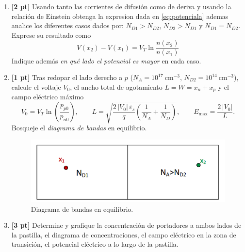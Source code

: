 \begin{enumerate}
  \item \textbf{[2 pt]}\;
  Usando tanto las corrientes de difusión como de deriva y usando la relación de Einstein obtenga la expresion dada en \eqref{eq:potenciala} ademas analice los diferentes casos dados por:
  \(N_{D1}>N_{D2}\), \(N_{D2}>N_{D1}\) y \(N_{D1}=N_{D2}\).
  Exprese su resultado como
  \begin{equation}
    V(x_2)-V(x_1)=V_T\ln\!\frac{n(x_2)}{n(x_1)}
    \label{eq:potenciala}
  \end{equation}
  Indique además \emph{en qué lado el potencial es mayor} en cada caso.

  \item \textbf{[1 pt]}\;
  Tras redopar el lado derecho a \(p\) (\(N_A=10^{17}~\mathrm{cm^{-3}}\), \(N_{D2}=10^{14}~\mathrm{cm^{-3}}\)),
  calcule el voltaje  \(V_0\), el ancho total de agotamiento \(L=W=x_n+x_p\) y el campo eléctrico máximo
  \[
  V_0 = V_T\ln\!\left(\frac{p_{p0}}{p_{n0}}\right),\qquad
  L=\sqrt{\frac{2\,|V_0|\,\varepsilon_s}{q}\!\left(\frac{1}{N_A}+\frac{1}{N_D}\right)},\qquad
  E_{\max}=\frac{2\,|V_0|}{L}.
  \]
  Bosqueje el \emph{diagrama de bandas} en equilibrio.
  \begin{figure}
    \centering
    \includegraphics[width=0.6\linewidth]{img/P1_9.png}
    \caption{Diagrama de bandas en equilibrio.}
    \label{fig:bandas_eq}
  \end{figure}
  \item \textbf{[3 pt]}\; Determine y grafique la concentración de portadores a ambos lados de la pastilla, el diagrama de concentraciones, el campo eléctrico en la zona de transición, el potencial eléctrico a lo largo de la pastilla.
\end{enumerate}



